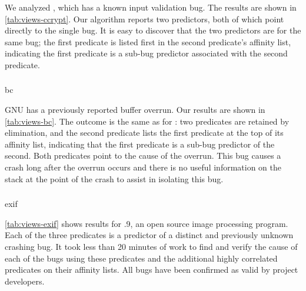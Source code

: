 We analyzed , which has a known input validation bug.  The
results are shown in \autoref{tab:views-ccrypt}.  Our algorithm
reports two predictors, both of which point directly to the single bug.
It is easy to discover that the two predictors are for the same bug;
the first predicate is listed first in the second predicate's affinity
list, indicating the first predicate is a sub-bug predictor associated
with the second predicate.

\subsubsection{\bc}

\begin{view}{\bc}{bc}
  
\end{view}

GNU  has a previously reported buffer overrun.  Our results
are shown in \autoref{tab:views-bc}.  The outcome is the same as for
\ccrypt: two predicates are retained by elimination, and the second
predicate lists the first predicate at the top of its affinity list,
indicating that the first predicate is a sub-bug predictor of the second.
Both predicates point to the cause of the overrun.  This bug causes a
crash long after the overrun occurs and there is no useful information
on the stack at the point of the crash to assist in isolating this
bug.

\subsubsection{\exif}

\begin{view}{\exif}{exif}
  
\end{view}

\autoref{tab:views-exif} shows results for .9, an open source
image processing program.  Each of the three predicates is a predictor
of a distinct and previously unknown crashing bug.  It took less than
20 minutes of work to find and verify the cause of each of the bugs
using these predicates and the additional highly correlated predicates
on their affinity lists.  All bugs have been confirmed as valid by
\exif project developers.

